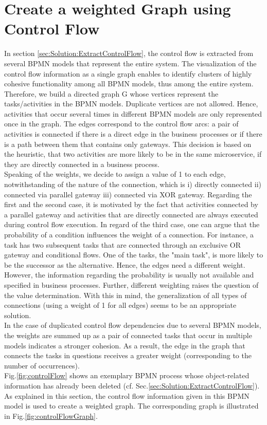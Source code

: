  \section{Create a weighted Graph using Control Flow}
 \label{sec:Solution:CreateGraphControl}
 In section \ref{sec:Solution:ExtractControlFlow}, the control flow is extracted from several BPMN models that represent the entire system.
 The visualization of the control flow information as a single graph enables to identify clusters of highly cohesive functionality among all BPMN models, thus among the entire system. 
 Therefore, we build a directed graph G whose vertices represent the tasks/activities in the BPMN models. Duplicate vertices are not allowed. Hence, activities that occur several times in different BPMN models are only represented once in the graph.
 The edges correspond to the control flow arcs: a pair of activities is connected if there is a direct edge in the business processes or if there is a path between them that contains only gateways. This decision is based on the heuristic, that two activities are more likely to be in the same microservice, if they are directly connected in a business process. \\
 Speaking of the weights, we decide to assign a value of 1 to each edge, notwithstanding of the nature of the connection, which is i) directly connected ii) connected via parallel gateway iii) connected via XOR gateway. Regarding the first and the second case, it is motivated by the fact that activities connected by a parallel gateway and activities that are directly connected are always executed during control flow execution.
 In regard of the third case, one can argue that the probability of a condition influences the weight of a connection. For instance, a task has two subsequent tasks that are connected through an exclusive OR gateway and conditional flows. One of the tasks, the "main task", is more likely to be the successor as the alternative. Hence, the edges need a different weight. However, the information regarding the probability is usually not available and specified in business processes. Further, different weighting raises the question of the value determination. With this in mind, the generalization of all types of connections (using a weight of 1 for all edges) seems to be an appropriate solution. \\
 In the case of duplicated control flow dependencies due to several BPMN models, the weights are summed up as a pair of connected tasks that occur in multiple models indicates a stronger cohesion. As a result, the edge in the graph that connects the tasks in questions receives a greater weight (corresponding to the number of occurrences).\\
 Fig.\ref{fig:controlFlow} shows an exemplary BPMN process whose object-related information has already been deleted (cf. Sec.\ref{sec:Solution:ExtractControlFlow}). As explained in this section, the control flow information given in this BPMN model is used to create a weighted graph. The corresponding graph is illustrated in Fig.\ref{fig:controlFlowGraph}. 
 
